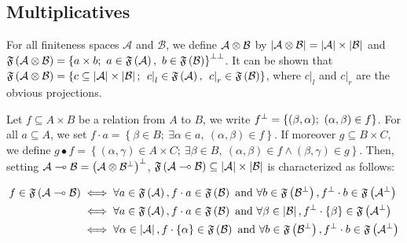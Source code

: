 \subsection{Multiplicatives}\label{multiplicatives}

For all finiteness spaces \({\mathcal A}\) and \({\mathcal B}\), we
define \({\mathcal A} \otimes {\mathcal B}\) by
\(\left|{\mathcal A} \otimes {\mathcal B}\right| = \left|\mathcal A\right| \times \left|\mathcal B\right|\)
and
\(\mathfrak F\left({\mathcal A} \tens {\mathcal B}\right) = \left\{a\times b;\ a\in \mathfrak F\left(\mathcal A\right),\ b\in\mathfrak F\left(\mathcal B\right)\right\}\biorth\).
It can be shown that
\(\mathfrak F\left({\mathcal A} \otimes {\mathcal B}\right) = \left\{ c \subseteq \left|\mathcal A\right|\times\left|\mathcal B\right|;\  \left.c\right|_l\in \mathfrak F\left(\mathcal A\right),\ \left.c\right|_r\in\mathfrak F\left(\mathcal B\right)\right\}\),
where \(\left.c\right|_l\) and \(\left.c\right|_r\) are the obvious
projections.

Let \(f\subseteq A \times B\) be a relation from \(A\) to \(B\), we
write \(f^\bot=\left\{(\beta,\alpha);\  (\alpha,\beta)\in f\right\}\).
For all \(a\subseteq A\), we set
\(f\cdot a = \left\{\beta\in B;\  \exists \alpha\in a,\ (\alpha,\beta)\in f\right\}\).
If moreover \(g\subseteq B \times C\), we define
\(g \bullet f = \left\{(\alpha,\gamma)\in A\times C;\  \exists \beta\in B,\ (\alpha,\beta)\in f\wedge(\beta,\gamma)\in g\right\}\).
Then, setting
\({\mathcal A}\multimap{\mathcal B} = \left({\mathcal A}\otimes {\mathcal B}^\bot\right)^\bot\),
\(\mathfrak F\left({\mathcal A}\multimap{\mathcal B}\right)\subseteq {\left|\mathcal A\right|\times\left|\mathcal B\right|}\)
is characterized as follows:

\begin{align*}
        f\in \mathfrak F\left({\mathcal A}\multimap{\mathcal B}\right) &\iff \forall a\in \mathfrak F\left({\mathcal A}\right), f\cdot a \in\mathfrak F\left({\mathcal B}\right) \text{ and } \forall b\in \mathfrak F\left({\mathcal B}^\bot\right), f^\bot\cdot b \in\mathfrak F\left({\mathcal A}^\bot\right)
        \\
        &\iff \forall a\in \mathfrak F\left({\mathcal A}\right), f\cdot a \in\mathfrak F\left({\mathcal B}\right) \text{ and } \forall \beta\in \left|{\mathcal B}\right|, f^\bot\cdot \left\{\beta\right\} \in\mathfrak F\left({\mathcal A}^\bot\right)
        \\
        &\iff \forall \alpha\in \left|{\mathcal A}\right|, f\cdot \left\{\alpha\right\} \in\mathfrak F\left({\mathcal B}\right) \text{ and } \forall b\in \mathfrak F\left({\mathcal B}^\bot\right), f^\bot\cdot b \in\mathfrak F\left({\mathcal A}^\bot\right)
\end{align*}

